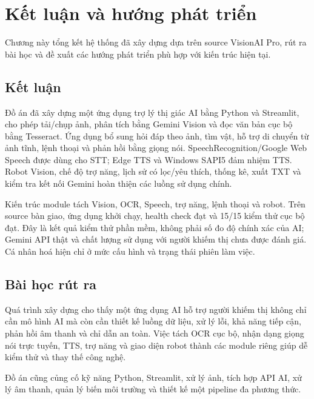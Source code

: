 \chapter{Kết luận và hướng phát triển}
\label{ch:ketluan}

\begin{muctieu}
Chương này tổng kết hệ thống đã xây dựng dựa trên source VisionAI Pro,
rút ra bài học và đề xuất các hướng phát triển phù hợp với kiến trúc hiện tại.
\end{muctieu}

\section{Kết luận}

Đồ án đã xây dựng một ứng dụng trợ lý thị giác AI bằng Python và Streamlit,
cho phép tải/chụp ảnh, phân tích bằng Gemini Vision và đọc văn bản cục bộ bằng
Tesseract. Ứng dụng bổ sung hỏi đáp theo ảnh, tìm vật, hỗ trợ di chuyển từ ảnh
tĩnh, lệnh thoại và phản hồi bằng giọng nói. SpeechRecognition/Google Web Speech
được dùng cho STT; Edge TTS và Windows SAPI5 đảm nhiệm TTS. Robot Vision, chế độ
trợ năng, lịch sử có lọc/yêu thích, thống kê, xuất TXT và kiểm tra kết nối
Gemini hoàn thiện các luồng sử dụng chính.

Kiến trúc module tách Vision, OCR, Speech, trợ năng, lệnh thoại và robot.
Trên source bàn giao, ứng dụng khởi chạy, health check đạt và 15/15 kiểm thử
cục bộ đạt. Đây là kết quả kiểm thử phần mềm, không phải số đo độ chính xác
của AI; Gemini API thật và chất lượng sử dụng với người khiếm thị chưa được
đánh giá. Cá nhân hoá hiện chỉ ở mức cấu hình và trạng thái phiên làm việc.

\section{Bài học rút ra}

Quá trình xây dựng cho thấy một ứng dụng AI hỗ trợ người khiếm thị không chỉ
cần mô hình AI mà còn cần thiết kế luồng dữ liệu, xử lý lỗi, khả năng tiếp cận,
phản hồi âm thanh và chỉ dẫn an toàn. Việc tách OCR cục bộ, nhận dạng giọng nói
trực tuyến, TTS, trợ năng và giao diện robot thành các module riêng giúp dễ
kiểm thử và thay thế công nghệ.

Đồ án cũng củng cố kỹ năng Python, Streamlit, xử lý ảnh, tích hợp API AI,
xử lý âm thanh, quản lý biến môi trường và thiết kế một pipeline đa phương thức.

